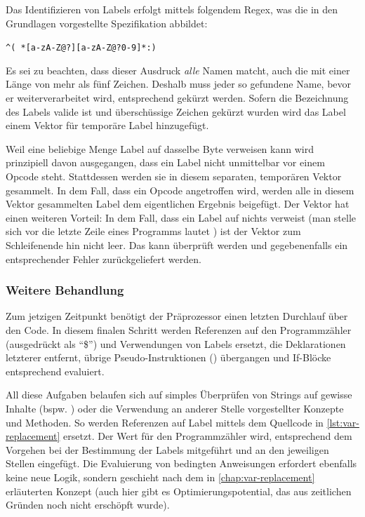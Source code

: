 Das Identifizieren von Labels erfolgt mittels folgendem Regex, was die in den Grundlagen vorgestellte Spezifikation abbildet:

\begin{center}
\texttt{\textasciicircum( *[a-zA-Z@?][a-zA-Z@?0-9]*:)}
\end{center}

Es sei zu beachten, dass dieser Ausdruck \textit{alle} Namen matcht, auch die mit einer Länge von mehr als fünf Zeichen. Deshalb muss jeder so gefundene Name, bevor er weiterverarbeitet wird, entsprechend gekürzt werden. Sofern die Bezeichnung des Labels valide ist und überschüssige Zeichen gekürzt wurden wird das Label einem Vektor für \glqq temporäre\grqq{} Label hinzugefügt.

Weil eine beliebige Menge Label auf dasselbe Byte verweisen kann wird prinzipiell davon ausgegangen, dass ein Label nicht unmittelbar vor einem Opcode steht. Stattdessen werden sie in diesem separaten, \glqq temporären\grqq{} Vektor gesammelt. In dem Fall, dass ein Opcode angetroffen wird, werden alle in diesem Vektor gesammelten Label dem eigentlichen Ergebnis beigefügt. Der Vektor hat einen weiteren Vorteil: In dem Fall, dass ein Label auf nichts verweist (man stelle sich vor die letzte Zeile eines Programms lautet ) ist der Vektor zum Schleifenende hin nicht leer. Das kann überprüft werden und gegebenenfalls ein entsprechender Fehler zurückgeliefert werden.

\subsubsection{Weitere Behandlung}

Zum jetzigen Zeitpunkt benötigt der Präprozessor einen letzten Durchlauf über den Code. In diesem finalen Schritt werden Referenzen auf den Programmzähler (ausgedrückt als \enquote{\$}) und Verwendungen von Labels ersetzt, die Deklarationen letzterer entfernt, übrige Pseudo-Instruktionen () übergangen und If-Blöcke entsprechend evaluiert.

All diese Aufgaben belaufen sich auf simples Überprüfen von Strings auf gewisse Inhalte (bspw. ) oder die Verwendung an anderer Stelle vorgestellter Konzepte und Methoden. So werden Referenzen auf Label mittels dem Quellcode in \ref{lst:var-replacement} ersetzt. Der Wert für den Programmzähler wird, entsprechend dem Vorgehen bei der Bestimmung der Labels mitgeführt und an den jeweiligen Stellen eingefügt. Die Evaluierung von bedingten Anweisungen erfordert ebenfalls keine neue Logik, sondern geschieht nach dem in \ref{chap:var-replacement} erläuterten Konzept (auch hier gibt es Optimierungspotential, das aus zeitlichen Gründen noch nicht erschöpft wurde).

